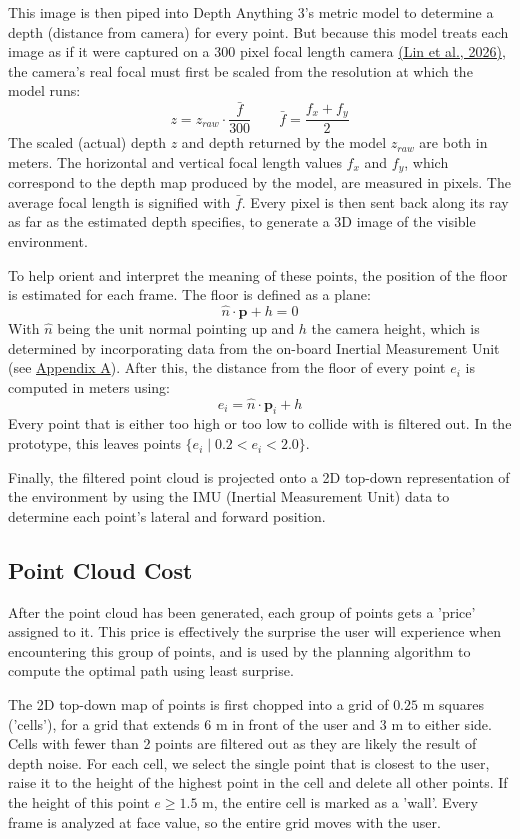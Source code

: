 \documentclass[a4paper]{article}
\begin{document}
This image is then piped into Depth Anything 3's metric model to determine a depth (distance from camera) for every point. But because this model treats each image as if it were captured on a 300 pixel focal length camera \hyperref[references]{(Lin et al., 2026)}, the camera's real focal must first be scaled from the resolution at which the model runs:
$$
z = z_{raw}\cdot \frac{\bar{f}}{300} \qquad \bar{f}=\frac{f_{x}+f_{y}}{2}
$$
The scaled (actual) depth $z$ and depth returned by the model $z_{raw}$ are both in meters. The horizontal and vertical focal length values $f_{x}$ and $f_{y}$, which correspond to the depth map produced by the model, are measured in pixels. The average focal length is signified with $\bar{f}$. Every pixel is then sent back along its ray as far as the estimated depth specifies, to generate a 3D image of the visible environment.

To help orient and interpret the meaning of these points, the position of the floor is estimated for each frame. The floor is defined as a plane:
$$
\hat n \cdot \mathbf p + h = 0
$$
With $\hat{n}$ being the unit normal pointing up and $h$ the camera height, which is determined by incorporating data from the on-board Inertial Measurement Unit (see \hyperref[a-from-imu-to-camera-up]{Appendix A}). After this, the distance from the floor of every point $e_{i}$ is computed in meters using:
$$e_i = \hat n \cdot \mathbf p_i + h$$
Every point that is either too high or too low to collide with is filtered out. In the prototype, this leaves points $\{e_{i} \mid 0.2 < e_{i} < 2.0\}$.

Finally, the filtered point cloud is projected onto a 2D top-down representation of the environment by using the IMU (Inertial Measurement Unit) data to determine each point's lateral and forward position. 

\subsection{Point Cloud Cost} \label{point-cloud-cost}
After the point cloud has been generated, each group of points gets a 'price' assigned to it. This price is effectively the surprise the user will experience when encountering this group of points, and is used by the planning algorithm to compute the optimal path using least surprise.

The 2D top-down map of points is first chopped into a grid of $0.25\text{ m}$ squares ('cells'), for a grid that extends $6\text{ m}$ in front of the user and $3\text{ m}$ to either side. Cells with fewer than 2 points are filtered out as they are likely the result of depth noise. For each cell, we select the single point that is closest to the user, raise it to the height of the highest point in the cell and delete all other points. If the height of this point $e \ge 1.5\text{ m}$, the entire cell is marked as a 'wall'. Every frame is analyzed at face value, so the entire grid moves with the user.
\end{document}
